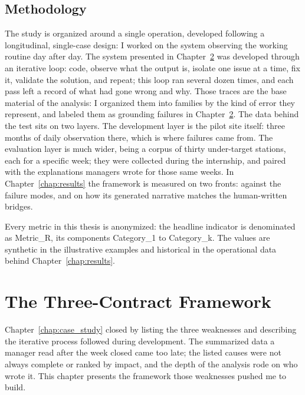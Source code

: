 \documentclass[12pt,a4paper,openright,twoside]{book}
\begin{document}
\section{Methodology}
The study is organized around a single operation, developed following a longitudinal, single-case design: I worked on the system observing the working routine day after day.
The system presented in Chapter~\ref{chap:proposed_solution} was developed through an iterative loop: code, observe what the output is, isolate one issue at a time, fix it, validate the solution, and repeat; this loop ran several dozen times, and each pass left a record of what had gone wrong and why.
Those traces are the base material of the analysis: I organized them into families by the kind of error they represent, and labeled them as grounding failures in Chapter~\ref{chap:proposed_solution}. 
The data behind the test sits on two layers.
The development layer is the pilot site itself: three months of daily observation there, which is where failures came from.
The evaluation layer is much wider, being a corpus of thirty under-target stations, each for a specific week; they were collected during the internship, and paired with the explanations managers wrote for those same weeks.
In Chapter~\ref{chap:results} the framework is measured on two fronts: against the failure modes, and on how its generated narrative matches the human-written bridges.


Every metric in this thesis is anonymized: the headline indicator is denominated as Metric\_R, its components Category\_1 to Category\_k. 
The values are synthetic in the illustrative examples and historical in the operational data behind Chapter~\ref{chap:results}.






\chapter{The Three-Contract Framework}
\label{chap:proposed_solution}

Chapter~\ref{chap:case_study} closed by listing the three weaknesses and describing the iterative process followed during development.
The summarized data a manager read after the week closed came too late; the listed causes were not always complete or ranked by impact, and the depth of the analysis rode on who wrote it.
This chapter presents the framework those weaknesses pushed me to build. 
\end{document}
